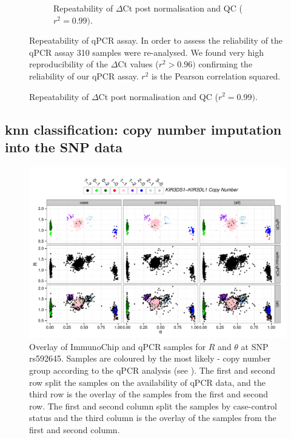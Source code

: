 \begin{figure}[h]
\begin{subfigure}[b]{.4\textwidth}
        \caption{Repeatability of  $\Delta$Ct post normalisation and QC ($r^{2}=0.99)$.}
        \label{}
    \end{subfigure}
    {Repeatability of qPCR assay.}
    {
        In order to assess the reliability of the qPCR assay 310 samples were re-analysed.
        We found very high reproducibility of the $\Delta$Ct values ($r^{2} > 0.96)$ confirming the reliability of our qPCR assay.
        $r^2$ is the Pearson correlation squared.
    }
\end{figure} 




\subsection{\gls{knn} classification: copy number imputation into the SNP data}

\begin{figure}[h!]
  \centering
  \includegraphics[scale=.5]{KIR/figures/Figure-2.pdf}
  {Overlay of ImmunoChip and qPCR samples for $R$ and $\theta$ at SNP rs592645.}
  { Samples are coloured by the most likely - copy number
  group according to the qPCR analysis (see ).  The
  first and second row split the samples on the availability of qPCR data, and
  the third row is the overlay of the samples from the first and second row.
  The first and second column split the samples by case-control status and the
  third column is the overlay of the samples from the first and second column.}
\end{figure}

